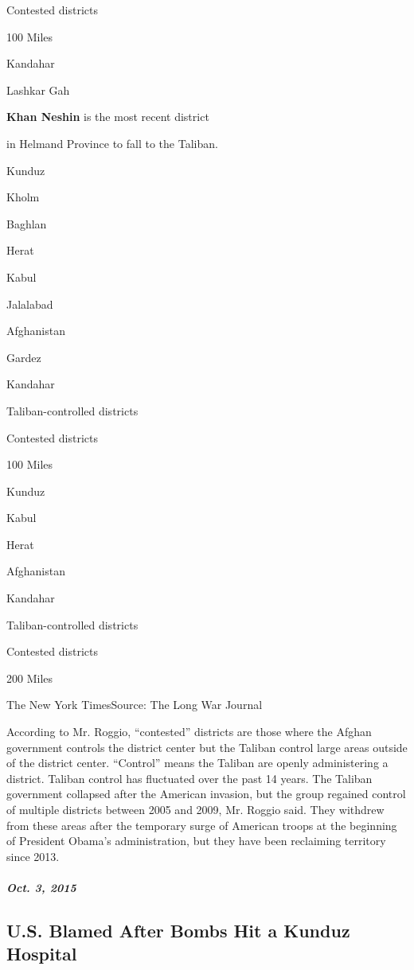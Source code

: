 Contested districts

100 Miles

Kandahar

Lashkar Gah

\textbf{Khan Neshin} is the most recent district

in Helmand Province to fall to the Taliban.

Kunduz

Kholm

Baghlan

Herat

Kabul

Jalalabad

Afghanistan

Gardez

Kandahar

Taliban-controlled districts

Contested districts

100 Miles

Kunduz

Kabul

Herat

Afghanistan

Kandahar

Taliban-controlled districts

Contested districts

200 Miles

The New York Times\textbar{}Source: The Long War Journal

According to Mr. Roggio, ``contested'' districts are those where the
Afghan government controls the district center but the Taliban control
large areas outside of the district center. ``Control'' means the
Taliban are openly administering a district. Taliban control has
fluctuated over the past 14 years. The Taliban government collapsed
after the American invasion, but the group regained control of multiple
districts between 2005 and 2009, Mr. Roggio said. They withdrew from
these areas after the temporary surge of American troops at the
beginning of President Obama's administration, but they have been
reclaiming territory since 2013.

\hypertarget{oct-3-2015}{%
\subparagraph{Oct. 3, 2015}\label{oct-3-2015}}

\hypertarget{us-blamed-after-bombs-hit-a-kunduz-hospital}{%
\subsection{U.S. Blamed After Bombs Hit a Kunduz
Hospital}\label{us-blamed-after-bombs-hit-a-kunduz-hospital}}

